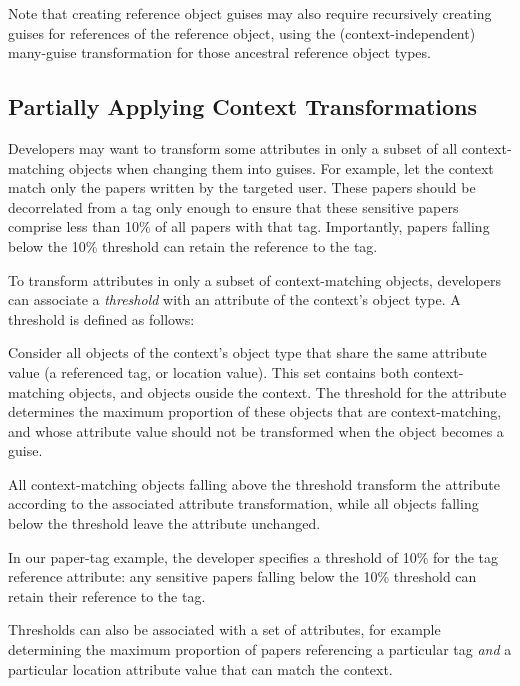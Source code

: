 Note that creating reference object guises may also require recursively creating guises for references of
the reference object, using the (context-independent) many-guise transformation for those ancestral reference
object types.

\subsection{Partially Applying Context Transformations}
\label{sec:threshold} 

Developers may want to transform some attributes in only a subset of all context-matching objects when
changing them into guises. 
For example, let the context match only the papers written by the targeted user. These papers should
be decorrelated from a tag only enough to ensure that these sensitive papers comprise less than 10\%
of all papers with that tag. Importantly, papers falling below the 10\% threshold can retain the
reference to the tag.

To transform attributes in only a subset of context-matching objects, developers can associate a
\emph{threshold} with an attribute of the context's object type.  A threshold is defined as follows:

Consider all objects of the context's object type that share the same attribute value (\eg a
referenced tag, or location value). This set contains both context-matching objects, and objects
ouside the context. The threshold for the attribute determines the maximum proportion of these
objects that are context-matching, and whose attribute value should not be transformed when the
object becomes a guise.

All context-matching objects falling above the threshold transform the attribute according to the
associated attribute transformation, while all objects falling below the threshold leave the
attribute unchanged. 

In our paper-tag example, the developer specifies a threshold of 10\% for the tag reference
attribute: any sensitive papers falling below the 10\% threshold can retain their reference to the tag.

Thresholds can also be associated with a set of
attributes, for example determining the maximum proportion of papers referencing a particular tag
\emph{and} a particular location attribute value that can match the context.


